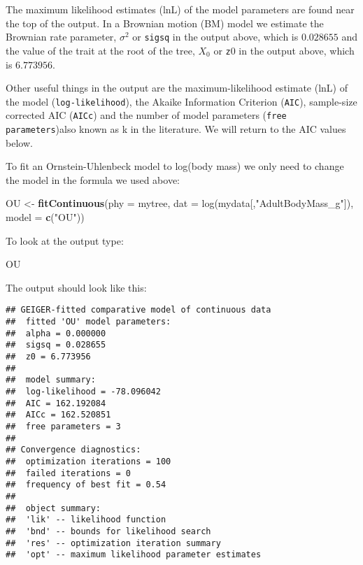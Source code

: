 \documentclass[11pt]{article}
\newcommand{\KeywordTok}[1]{\textcolor[rgb]{0.13,0.29,0.53}{\textbf{{#1}}}}
\newcommand{\DataTypeTok}[1]{\textcolor[rgb]{0.13,0.29,0.53}{{#1}}}
\newcommand{\CharTok}[1]{\textcolor[rgb]{0.31,0.60,0.02}{{#1}}}
\newcommand{\StringTok}[1]{\textcolor[rgb]{0.31,0.60,0.02}{{#1}}}
\newcommand{\NormalTok}[1]{{#1}}
\begin{document}
The maximum likelihood estimates (lnL) of the model parameters are found near the top of the output. In a Brownian motion (BM) model we estimate the Brownian rate parameter, $\sigma^2$ or \texttt{sigsq} in the output above, which is $0.028655$ and the value of the trait at the root of the tree, $X_0$ or \texttt{z$0$} in the output above, which is $6.773956$.

Other useful things in the output are the maximum-likelihood estimate (lnL) of the model (\texttt{log-likelihood}), the Akaike Information Criterion (\texttt{AIC}), sample-size corrected AIC (\texttt{AICc}) and the number of model parameters (\texttt{free parameters})also known as k in the literature. We will return to the AIC values below.

To fit an Ornstein-Uhlenbeck model to log(body mass) we only need to change the model in the formula we used above:

\begin{snugshade}
\begin{Highlighting}[]
\NormalTok{OU <-}\StringTok{ }\KeywordTok{fitContinuous}\NormalTok{(\DataTypeTok{phy = }mytree, \DataTypeTok{dat = }log(mydata[,"AdultBodyMass_g"]),} 
                    \DataTypeTok{model = }\KeywordTok{c}\NormalTok{(}\StringTok{"}\CharTok{OU}\StringTok{"}\NormalTok{))}
\end{Highlighting}
\end{snugshade}

To look at the output type:

\begin{snugshade}
\begin{Highlighting}[]
\NormalTok{OU}
\end{Highlighting}
\end{snugshade}

The output should look like this:

\begin{verbatim}
## GEIGER-fitted comparative model of continuous data
##  fitted 'OU' model parameters:
##  alpha = 0.000000
##  sigsq = 0.028655
##  z0 = 6.773956
## 
##  model summary:
##  log-likelihood = -78.096042
##  AIC = 162.192084
##  AICc = 162.520851
##  free parameters = 3
## 
## Convergence diagnostics:
##  optimization iterations = 100
##  failed iterations = 0
##  frequency of best fit = 0.54
## 
##  object summary:
##  'lik' -- likelihood function
##  'bnd' -- bounds for likelihood search
##  'res' -- optimization iteration summary
##  'opt' -- maximum likelihood parameter estimates
\end{verbatim}
\end{document}
